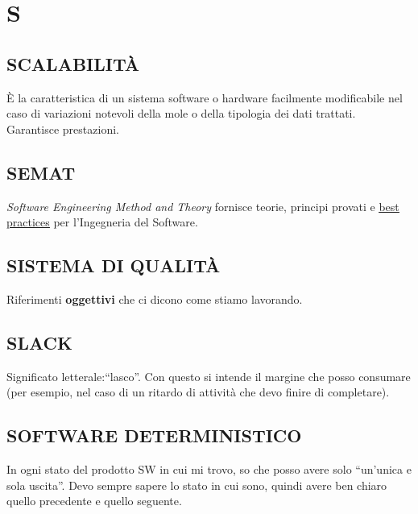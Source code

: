 \newpage
	\section{S} \label{sec:S}

		\subsection{SCALABILITÀ}  \label{scalabitlita}
		È la caratteristica di un sistema software o hardware facilmente modificabile nel caso di variazioni notevoli della mole o della tipologia dei dati trattati. \\
		Garantisce prestazioni.


		\subsection{SEMAT}  \label{semat}
		\textit{Software Engineering Method and Theory} fornisce teorie, principi provati e \underline{\hyperref[best]{best practices}} per l'Ingegneria del Software.


		\subsection{SISTEMA DI QUALITÀ}  \label{sistemadiqualita}
		Riferimenti \textbf{oggettivi} che ci dicono come stiamo lavorando.


		\subsection{SLACK}  \label{slack}
		Significato letterale:``lasco''. Con questo si intende il margine che posso consumare (per esempio, nel caso di un ritardo di attività che devo finire di completare).


		\subsection{SOFTWARE DETERMINISTICO}  \label{softwaredeterministico}
		In ogni stato del prodotto SW in cui mi trovo, so che posso avere solo ``un'unica e sola uscita''. Devo sempre sapere lo stato in cui sono, quindi avere ben chiaro quello precedente e quello seguente.


